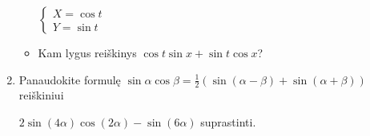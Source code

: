 \documentclass[a4paper]{article}
\begin{document}
\begin{enumerate}
\begin{itemize}
$\begin{cases}X=\cos t \\ Y=\sin t \end{cases}$
\item Kam lygus reiškinys $\cos t \sin x + \sin t \cos x$?
\end{itemize}
\item Panaudokite formulę $\boxed{\sin \alpha \cos \beta=\frac{1}{2}\left(\sin (\alpha-\beta)+\sin (\alpha+\beta)\right)}$ reiškiniui

 $2\sin(4\alpha)\cos(2\alpha) - \sin(6\alpha)$ suprastinti.
\end{enumerate}
\end{document}
